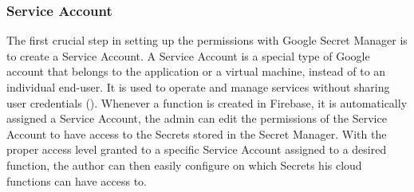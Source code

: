 \subsubsection{Service Account}

The first crucial step in setting up the permissions with Google Secret Manager is to create a Service Account. A Service Account is
a special type of Google account that belongs to the application or a virtual machine, instead of to an individual end-user. It is
used to operate and manage services without sharing user credentials (\textit{\cite{serviceAccounts}}). Whenever a function is created
in Firebase, it is automatically assigned a Service Account, the admin can edit the permissions of the Service Account to have access
to the Secrets stored in the Secret Manager. With the proper access level granted to a specific Service Account assigned to a desired
function, the author can then easily configure on which Secrets his cloud functions can have access to.




